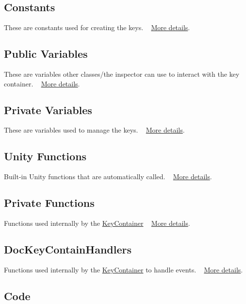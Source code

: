 \hypertarget{group___doc_key_contain_DocKeyContainConst}{}\subsection{Constants}\label{group___doc_key_contain_DocKeyContainConst}
These are constants used for creating the keys. ~\newline
 \hyperlink{group___key_contain_const}{More details}.\hypertarget{group___doc_key_contain_DocKeyContainPubVar}{}\subsection{Public Variables}\label{group___doc_key_contain_DocKeyContainPubVar}
These are variables other classes/the inspector can use to interact with the key container. ~\newline
 \hyperlink{group___key_contain_pub_var}{More details}.\hypertarget{group___doc_key_contain_DocKeyContainPrivVar}{}\subsection{Private Variables}\label{group___doc_key_contain_DocKeyContainPrivVar}
These are variables used to manage the keys. ~\newline
 \hyperlink{group___key_contain_priv_var}{More details}.\hypertarget{group___doc_key_contain_DocKeyContainUnity}{}\subsection{Unity Functions}\label{group___doc_key_contain_DocKeyContainUnity}
Built-\/in Unity functions that are automatically called. ~\newline
 \hyperlink{group___key_contain_unity}{More details}.\hypertarget{group___doc_key_contain_DocKeyContainPrivFunc}{}\subsection{Private Functions}\label{group___doc_key_contain_DocKeyContainPrivFunc}
Functions used internally by the \hyperlink{class_key_container}{Key\+Container} ~\newline
 \hyperlink{group___key_contain_priv_func}{More details}.\hypertarget{group___doc_key_contain_DocKeyContainHandlers}{}\subsection{Doc\+Key\+Contain\+Handlers}\label{group___doc_key_contain_DocKeyContainHandlers}
Functions used internally by the \hyperlink{class_key_container}{Key\+Container} to handle events. ~\newline
 \hyperlink{group___key_contain_handlers}{More details}.\hypertarget{group___doc_key_contain_DocKeyContainCode}{}\subsection{Code}\label{group___doc_key_contain_DocKeyContainCode}

